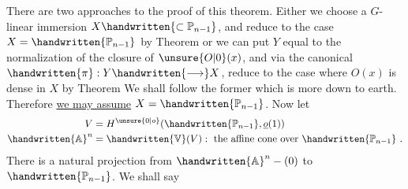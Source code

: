 There are two approaches to the proof of this theorem. Either we choose a $G$-linear immersion $X\handwritten{\subset\mathbb{P}_{n-1}}$, and reduce to the case $X=\handwritten{\mathbb{P}_{n-1}}$ by Theorem  or we can put $Y$ equal to the normalization of the closure of $\unsure{O|0}(x)$, and via the canonical $\handwritten{\pi}:Y\handwritten{\longrightarrow}X$, reduce to the case where $O(x)$ is dense in $X$ by Theorem  We shall follow the former which is more down to earth. Therefore \uline{we may assume} $X=\handwritten{\mathbb{P}_{n-1}}$. Now let
\[
\begin{aligned}
V&=H^{\unsure{0|o}}(\handwritten{\mathbb{P}_{n-1}},\underline{o}(1))\\
\handwritten{\mathbb{A}}^{n}&=\handwritten{\mathbb{V}}(V):\text{ the affine cone over }\handwritten{\mathbb{P}_{n-1}}\ .
\end{aligned}
\]
There is a natural projection from $\handwritten{\mathbb{A}}^{n}-(0)$ to $\handwritten{\mathbb{P}_{n-1}}$. We shall say
